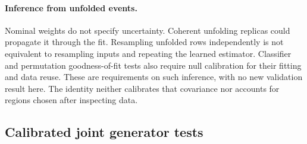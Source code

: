 \paragraph{Inference from unfolded events.} Nominal weights do not specify uncertainty. Coherent unfolding replicas could propagate it through the fit. Resampling unfolded rows independently is not equivalent to resampling inputs and repeating the learned estimator. Classifier and permutation goodness-of-fit tests also require null calibration for their fitting and data reuse. These are requirements on such inference, with no new validation result here. The identity neither calibrates that covariance nor accounts for regions chosen after inspecting data.

\subsection{Calibrated joint generator tests}\label{recsec:methods-joint}


